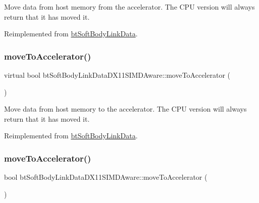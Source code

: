Move data from host memory from the accelerator. The C\+PU version will always return that it has moved it. 

Reimplemented from \hyperlink{classbtSoftBodyLinkData_a5018ad236aae590df94bca63c1ad7ee1}{bt\+Soft\+Body\+Link\+Data}.

\mbox{\label{classbtSoftBodyLinkDataDX11SIMDAware_a693af44067395dc322c7cd575f79b980}} 
\subsubsection{\texorpdfstring{move\+To\+Accelerator()}{moveToAccelerator()}\hspace{0.1cm}{\footnotesize\ttfamily [1/2]}}
{\footnotesize\ttfamily virtual bool bt\+Soft\+Body\+Link\+Data\+D\+X11\+S\+I\+M\+D\+Aware\+::move\+To\+Accelerator (\begin{DoxyParamCaption}{ }\end{DoxyParamCaption})\hspace{0.3cm}{\ttfamily [virtual]}}

Move data from host memory to the accelerator. The C\+PU version will always return that it has moved it. 

Reimplemented from \hyperlink{classbtSoftBodyLinkData_a6cce268f804d465f3bc998771d3a7433}{bt\+Soft\+Body\+Link\+Data}.

\mbox{\label{classbtSoftBodyLinkDataDX11SIMDAware_ab498ee8250262804abb96ee7f67cba29}} 
\subsubsection{\texorpdfstring{move\+To\+Accelerator()}{moveToAccelerator()}\hspace{0.1cm}{\footnotesize\ttfamily [2/2]}}
{\footnotesize\ttfamily bool bt\+Soft\+Body\+Link\+Data\+D\+X11\+S\+I\+M\+D\+Aware\+::move\+To\+Accelerator (\begin{DoxyParamCaption}{ }\end{DoxyParamCaption})\hspace{0.3cm}{\ttfamily [virtual]}}

